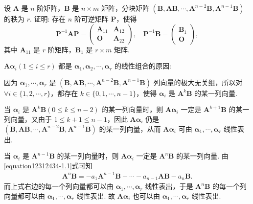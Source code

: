 \documentclass[../../main.tex]{subfiles}
\begin{document}
\begin{example}
设 $\boldsymbol{A}$ 是 $n$ 阶矩阵，$\boldsymbol{B}$ 是 $n\times m$ 矩阵，分块矩阵 $(\boldsymbol{B},\boldsymbol{A}\boldsymbol{B},\cdots,\boldsymbol{A}^{n - 2}\boldsymbol{B},\boldsymbol{A}^{n - 1}\boldsymbol{B})$ 的秩为 $r$. 证明: 存在 $n$ 阶可逆矩阵 $\boldsymbol{P}$，使得
\[
\boldsymbol{P}^{-1}\boldsymbol{A}\boldsymbol{P}=\begin{pmatrix}
\boldsymbol{A}_{11} & \boldsymbol{A}_{12} \\
\boldsymbol{O} & \boldsymbol{A}_{22}
\end{pmatrix}, \quad
\boldsymbol{P}^{-1}\boldsymbol{B}=\begin{pmatrix}
\boldsymbol{B}_1 \\
\boldsymbol{O}
\end{pmatrix},
\]
其中 $\boldsymbol{A}_{11}$ 是 $r$ 阶矩阵，$\boldsymbol{B}_1$ 是 $r\times m$ 矩阵.
\end{example}
\begin{remark}
\hypertarget{例题0.7容易验证的原因}{$\boldsymbol{A}\boldsymbol{\alpha}_i(1\leqslant  i\leqslant  r)$ 都是 $\boldsymbol{\alpha}_1,\boldsymbol{\alpha}_2,\cdots,\boldsymbol{\alpha}_r$ 的线性组合的原因:}因为 $\boldsymbol{\alpha}_1,\cdots,\boldsymbol{\alpha}_r$ 是 $(\boldsymbol{B},\boldsymbol{A}\boldsymbol{B},\cdots,\boldsymbol{A}^{n - 2}\boldsymbol{B},\boldsymbol{A}^{n - 1}\boldsymbol{B})$ 列向量的极大无关组，所以对 $\forall i\in\{1,2,\cdots,r\}$，都存在 $k\in\{0,1,\cdots,n - 1\}$，使得 $\boldsymbol{\alpha}_i$ 是 $\boldsymbol{A}^k\boldsymbol{B}$ 的某一列向量.

当 $\boldsymbol{\alpha}_i$ 是 $\boldsymbol{A}^k\boldsymbol{B}(0\leqslant k\leqslant n - 2)$ 的某一列向量时，则 $\boldsymbol{A}\boldsymbol{\alpha}_i$ 一定是 $\boldsymbol{A}^{k + 1}\boldsymbol{B}$ 的某一列向量，又由于 $1\leqslant k + 1\leqslant n - 1$，因此 $\boldsymbol{A}\boldsymbol{\alpha}_i$ 仍是 $(\boldsymbol{B},\boldsymbol{AB},\cdots,\boldsymbol{A}^{n - 2}\boldsymbol{B},\boldsymbol{A}^{n - 1}\boldsymbol{B})$ 的某一列向量，从而 $\boldsymbol{A}\boldsymbol{\alpha}_i$ 可由 $\boldsymbol{\alpha}_1,\cdots,\boldsymbol{\alpha}_r$ 线性表出.

当 $\boldsymbol{\alpha}_i$ 是 $\boldsymbol{A}^{n - 1}\boldsymbol{B}$ 的某一列向量时，则 $\boldsymbol{A}\boldsymbol{\alpha}_i$ 一定是 $\boldsymbol{A}^n\boldsymbol{B}$ 的某一列向量. 由\eqref{equation12312434-1.1}式可知
\begin{align*}
\boldsymbol{A}^n\boldsymbol{B}=-a_1\boldsymbol{A}^{n - 1}\boldsymbol{B}-\cdots - a_{n - 1}\boldsymbol{A}\boldsymbol{B}-a_n\boldsymbol{B}.
\end{align*}
而上式右边的每一个列向量都可以由 $\boldsymbol{\alpha}_1,\cdots,\boldsymbol{\alpha}_r$ 线性表出，于是 $\boldsymbol{A}^n\boldsymbol{B}$ 的每一个列向量都可以由 $\boldsymbol{\alpha}_1,\cdots,\boldsymbol{\alpha}_r$ 线性表出. 故 $\boldsymbol{A}\boldsymbol{\alpha}_i$ 也可以由 $\boldsymbol{\alpha}_1,\cdots,\boldsymbol{\alpha}_r$ 线性表出. 
\end{remark}
\end{document}

